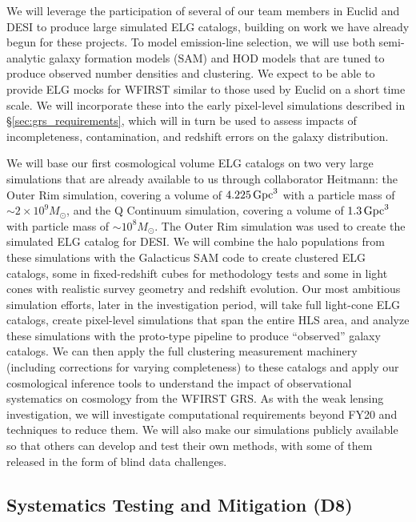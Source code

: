 We will leverage the participation of several of our team members in 
Euclid and DESI to produce large simulated ELG catalogs,
building on work we have already begun for these projects.
To model emission-line selection, we will use both semi-analytic galaxy
formation models (SAM) and HOD models that are tuned to produce
observed number densities and clustering.
We expect to be able to provide ELG mocks for WFIRST similar to those used 
by Euclid on a short time scale.
We will incorporate these into the early pixel-level 
simulations described in \S\ref{sec:grs_requirements},
which will in turn be used to assess impacts of incompleteness,
contamination, and redshift errors on the galaxy distribution.

We will base our first cosmological volume ELG catalogs on two very large simulations
that are already available to us through collaborator Heitmann: 
the Outer Rim simulation, covering
a volume of $4.225\,{\rm Gpc}^3$ with a particle mass of
$\sim 2\times 10^9 M_\odot$,
and the Q Continuum simulation, covering a volume of $1.3\,{\rm Gpc}^3$
with particle mass of $\sim 10^8 M_\odot$.
The Outer Rim simulation was used to create the simulated ELG
catalog for DESI.
We will combine the halo populations from these simulations with the
Galacticus SAM code \cite{Benson2010} to create clustered ELG catalogs,
some in fixed-redshift cubes for methodology tests and some in light cones
with realistic survey geometry and redshift evolution.
Our most ambitious simulation efforts, later in the investigation
period, will take full light-cone ELG catalogs, create pixel-level
simulations that span the entire HLS area, and analyze these simulations
with the proto-type pipeline to produce ``observed'' galaxy catalogs.
We can then apply the full clustering measurement machinery 
(including corrections for varying completeness) to these catalogs
and apply our cosmological inference tools 
to understand the impact of observational systematics on
cosmology from the WFIRST GRS.
As with the weak lensing investigation, we will investigate computational
requirements beyond FY20 and techniques to reduce them. We will also make our
simulations publicly available so that others can develop and
test their own methods, with some of them released in the form of blind
data challenges.

\subsection{Systematics Testing and Mitigation (D8)}
\label{sec:gal_syst}



